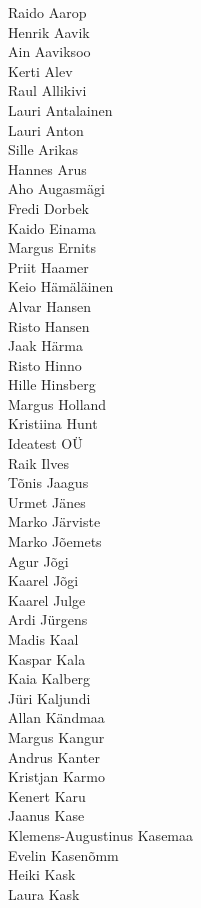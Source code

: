 \begin{multicols}{3}
\footnotesize
Raido Aarop\\
Henrik Aavik\\
Ain Aaviksoo\\
Kerti Alev\\
Raul Allikivi\\
Lauri Antalainen\\
Lauri Anton\\
Sille Arikas\\
Hannes Arus\\
Aho Augasmägi\\
Fredi Dorbek\\
Kaido Einama\\
Margus Ernits\\
Priit Haamer\\
Keio Hämäläinen\\
Alvar Hansen\\
Risto Hansen\\
Jaak Härma\\
Risto Hinno\\
Hille Hinsberg\\
Margus Holland\\
Kristiina Hunt\\
Ideatest OÜ\\
Raik Ilves\\
Tõnis Jaagus\\
Urmet Jänes\\
Marko Järviste\\
Marko Jõemets\\
Agur Jõgi\\
Kaarel Jõgi\\
Kaarel Julge\\
Ardi Jürgens\\
Madis Kaal\\
Kaspar Kala\\
Kaia Kalberg\\
Jüri Kaljundi\\
Allan Kändmaa\\
Margus Kangur\\
Andrus Kanter\\
Kristjan Karmo\\
Kenert Karu\\
Jaanus Kase\\
Klemens-Augustinus Kasemaa\\
Evelin Kasenõmm\\
Heiki Kask\\
Laura Kask\\

\end{multicols}

